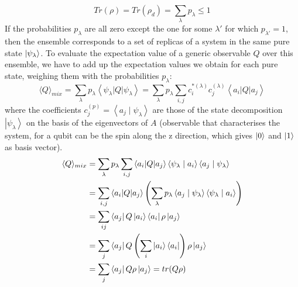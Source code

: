 \begin{equation*}
    Tr(\rho) = Tr(\rho_d) = \sum_{\lambda}p_{\lambda} \leq 1
\end{equation*}
If the probabilities $p_{\lambda}$ are all zero except the one for some $\lambda'$ for which $p_{\lambda'}=1$, then the ensemble corresponds to a set of replicas of a system in the same pure state $\ket{\psi_{\lambda}}$.
To evaluate the expectation value of a generic observable $Q$ over this ensemble, we have to add up the expectation values we obtain for each pure state, weighing them with the probabilities $p_{\lambda}$:
$$
\langle Q\rangle_{mix}=\sum_{\lambda} p_{\lambda}\left\langle\psi_{\lambda}|Q| \psi_{\lambda}\right\rangle=\sum_{\lambda} p_{\lambda} \sum_{i, j} c_{i}^{*(\lambda)} c_{j}^{(\lambda)}\left\langle a_{i}|Q| a_{j}\right\rangle
$$
where the coefficients  $c_{j}^{(p)}=\left\langle a_{j} \mid \psi_{\lambda}\right\rangle$ are those of the state decomposition $\left|\psi_{\lambda}\right\rangle$ on the basis of the eigenvectors of $A$ (observable that characterises the system, for a qubit can be the spin along the z direction, which gives $\ket{0}$ and $\ket{1}$ as basis vector).
$$
\begin{aligned}
\langle Q\rangle_{mix} &=\sum_{\lambda} p_{\lambda} \sum_{i, j} \left\langle a_{i}|Q| a_{j}\right\rangle  \left\langle\psi_{\lambda} \mid a_{i}\right\rangle\left\langle a_{j} \mid \psi_{\lambda}\right\rangle\\
&=\sum_{i, j} \left\langle a_{i}|Q| a_{j}\right\rangle \left(\sum_{\lambda} p_{\lambda} \left\langle a_{j} \mid \psi_{\lambda}\right\rangle\left\langle\psi_{\lambda} \mid a_{i}\right\rangle\right) \\
&=\sum_{ij} \bra{a_j} Q \ket{a_i} \bra{a_i} \rho\ket{a_j}\\
&=\sum_{j} \bra{a_j} Q \left(\sum_i \ket{a_i}\bra{a_i} \right) \rho\ket{a_j} \\
&=\sum_{j} \bra{a_j}Q \rho \ket{a_j} = tr(Q \rho)
\end{aligned}
$$



 
